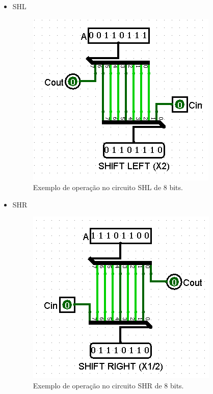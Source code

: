 \documentclass[
	12pt,				%
	openright,			%
	twoside,			%
	a4paper,			%
	english,			%
	french,				%
	spanish,			%
	brazil,				%
	]{abntex2}
\begin{document}
\begin{apendicesenv}
\begin{itemize}
\item {SHL}

\begin{figure}[H]
	\begin{center}
	    \includegraphics[scale=0.6]{SHLteste.png}
	\end{center}
\caption{\label{shlteste}Exemplo de operação no circuito SHL de 8 bits.}
\end{figure}

\item {SHR}

\begin{figure}[H]
	\begin{center}
	    \includegraphics[scale=0.6]{SHRteste.png}
	\end{center}
\caption{\label{shrteste}Exemplo de operação no circuito SHR de 8 bits.}
\end{figure}

\end{itemize}


\end{apendicesenv}
\end{document}
